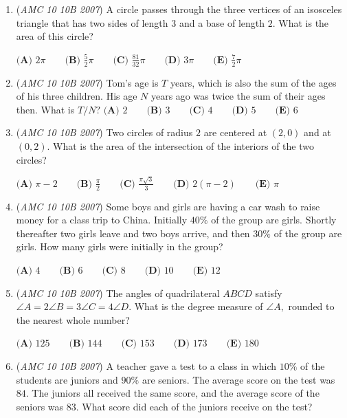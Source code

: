 \begin{enumerate}
	\item (\textit{AMC 10 10B 2007}) A circle passes through the three vertices of an isosceles triangle that has two sides of length $3$ and a base of length $2.$ What is the area of this circle?


 $\textbf{(A) } 2\pi \qquad\textbf{(B) } \frac{5}{2}\pi \qquad\textbf{(C) } \frac{81}{32}\pi \qquad\textbf{(D) } 3\pi \qquad\textbf{(E) } \frac{7}{2}\pi$


	\item (\textit{AMC 10 10B 2007}) Tom's age is $T$ years, which is also the sum of the ages of his three children. His age $N$ years ago was twice the sum of their ages then. What is $T/N?$
$\textbf{(A) } 2 \qquad\textbf{(B) } 3 \qquad\textbf{(C) } 4 \qquad\textbf{(D) } 5 \qquad\textbf{(E) } 6$


	\item (\textit{AMC 10 10B 2007}) Two circles of radius $2$ are centered at $(2,0)$ and at $(0,2).$ What is the area of the intersection of the interiors of the two circles?


 $\textbf{(A) } \pi -2 \qquad\textbf{(B) } \frac{\pi}{2} \qquad\textbf{(C) } \frac{\pi \sqrt{3}}{3} \qquad\textbf{(D) } 2(\pi -2) \qquad\textbf{(E) } \pi$


	\item (\textit{AMC 10 10B 2007}) Some boys and girls are having a car wash to raise money for a class trip to China. Initially $40\%$ of the group are girls. Shortly thereafter two girls leave and two boys arrive, and then $30\%$ of the group are girls. How many girls were initially in the group?


 $\textbf{(A) } 4 \qquad\textbf{(B) } 6 \qquad\textbf{(C) } 8 \qquad\textbf{(D) } 10 \qquad\textbf{(E) } 12$


	\item (\textit{AMC 10 10B 2007}) The angles of quadrilateral $ABCD$ satisfy $\angle A=2 \angle B=3 \angle C=4 \angle D.$ What is the degree measure of $\angle A,$ rounded to the nearest whole number?


 $\textbf{(A) } 125 \qquad\textbf{(B) } 144 \qquad\textbf{(C) } 153 \qquad\textbf{(D) } 173 \qquad\textbf{(E) } 180$


	\item (\textit{AMC 10 10B 2007}) A teacher gave a test to a class in which $10\%$ of the students are juniors and $90\%$ are seniors. The average score on the test was $84.$ The juniors all received the same score, and the average score of the seniors was $83.$ What score did each of the juniors receive on the test?



\end{enumerate}
